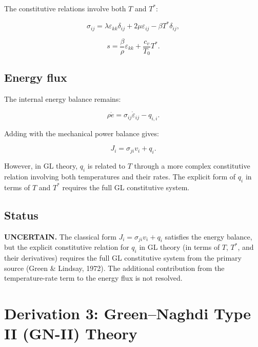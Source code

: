 \documentclass{article}
\begin{document}
The constitutive relations involve both $T$ and $T^*$:

\begin{equation}
\sigma_{ij} = \lambda\varepsilon_{kk}\delta_{ij} + 2\mu\varepsilon_{ij} - \beta T^*\delta_{ij},
\label{ef:gl:2}
\end{equation}

\begin{equation}
s = \frac{\beta}{\rho}\varepsilon_{kk} + \frac{c_v}{T_0}T^*.
\label{ef:gl:3}
\end{equation}

\subsection{Energy flux}

The internal energy balance remains:

\begin{equation}
\rho\dot{e} = \sigma_{ij}\dot{\varepsilon}_{ij} - q_{i,i}.
\label{ef:gl:4}
\end{equation}

Adding with the mechanical power balance gives:

\begin{equation}
J_i = \sigma_{ji}v_i + q_i.
\label{ef:gl:5}
\end{equation}

However, in GL theory, $q_i$ is related to $T$ through a more complex constitutive relation involving both temperatures and their rates. The explicit form of $q_i$ in terms of $T$ and $T^*$ requires the full GL constitutive system.

\subsection{Status}

\textbf{UNCERTAIN.} The classical form $J_i = \sigma_{ji}v_i + q_i$ satisfies the energy balance, but the explicit constitutive relation for $q_i$ in GL theory (in terms of $T$, $T^*$, and their derivatives) requires the full GL constitutive system from the primary source (Green \& Lindsay, 1972). The additional contribution from the temperature-rate term to the energy flux is not resolved.

\section{Derivation 3: Green--Naghdi Type II (GN-II) Theory}
\end{document}
